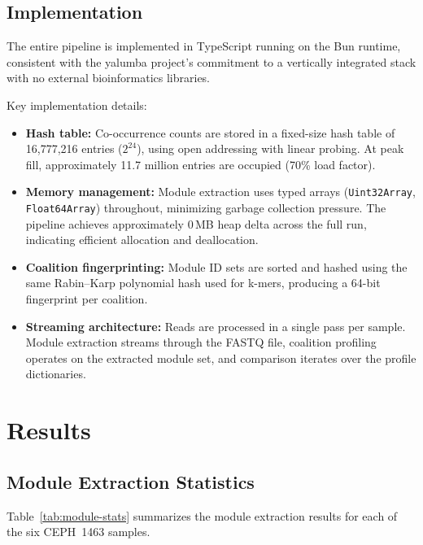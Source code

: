 \documentclass{../yalumba}
\begin{document}
\subsection{Implementation}
\label{sec:methods-impl}

The entire pipeline is implemented in TypeScript running on the Bun runtime,
consistent with the yalumba project's commitment to a vertically integrated
stack with no external bioinformatics libraries.

Key implementation details:

\begin{itemize}
  \item \textbf{Hash table:} Co-occurrence counts are stored in a fixed-size
        hash table of 16{,}777{,}216 entries ($2^{24}$), using open addressing
        with linear probing.  At peak fill, approximately 11.7 million entries
        are occupied (70\% load factor).
  \item \textbf{Memory management:} Module extraction uses typed arrays
        (\texttt{Uint32Array}, \texttt{Float64Array}) throughout, minimizing
        garbage collection pressure.  The pipeline achieves approximately 0\,MB
        heap delta across the full run, indicating efficient allocation and
        deallocation.
  \item \textbf{Coalition fingerprinting:} Module ID sets are sorted and
        hashed using the same Rabin--Karp polynomial hash used for k-mers,
        producing a 64-bit fingerprint per coalition.
  \item \textbf{Streaming architecture:} Reads are processed in a single pass
        per sample.  Module extraction streams through the FASTQ file,
        coalition profiling operates on the extracted module set, and
        comparison iterates over the profile dictionaries.
\end{itemize}


\section{Results}
\label{sec:results}

\subsection{Module Extraction Statistics}
\label{sec:results-modules}

Table~\ref{tab:module-stats} summarizes the module extraction results for
each of the six CEPH~1463 samples.
\end{document}
